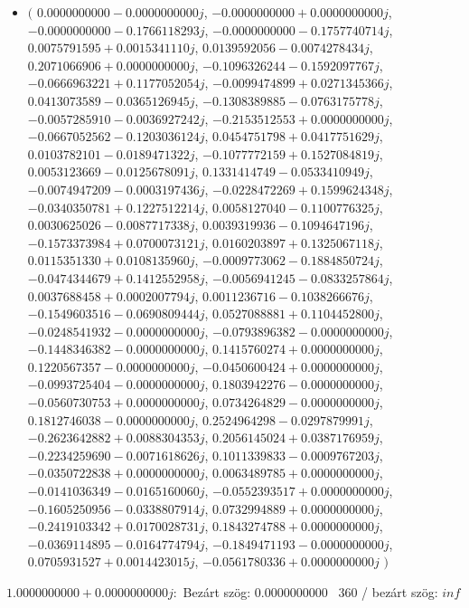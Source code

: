 \documentclass[14pt,a4paper]{article}
\begin{document}
\begin{itemize}
\item
$\big($
$0.0000000000-0.0000000000j$, $-0.0000000000+0.0000000000j$, $-0.0000000000-0.1766118293j$, $-0.0000000000-0.1757740714j$, $0.0075791595+0.0015341110j$, $0.0139592056-0.0074278434j$, $0.2071066906+0.0000000000j$, $-0.1096326244-0.1592097767j$, $-0.0666963221+0.1177052054j$, $-0.0099474899+0.0271345366j$, $0.0413073589-0.0365126945j$, $-0.1308389885-0.0763175778j$, $-0.0057285910-0.0036927242j$, $-0.2153512553+0.0000000000j$, $-0.0667052562-0.1203036124j$, $0.0454751798+0.0417751629j$, $0.0103782101-0.0189471322j$, $-0.1077772159+0.1527084819j$, $0.0053123669-0.0125678091j$, $0.1331414749-0.0533410949j$, $-0.0074947209-0.0003197436j$, $-0.0228472269+0.1599624348j$, $-0.0340350781+0.1227512214j$, $0.0058127040-0.1100776325j$, $0.0030625026-0.0087717338j$, $0.0039319936-0.1094647196j$, $-0.1573373984+0.0700073121j$, $0.0160203897+0.1325067118j$, $0.0115351330+0.0108135960j$, $-0.0009773062-0.1884850724j$, $-0.0474344679+0.1412552958j$, $-0.0056941245-0.0833257864j$, $0.0037688458+0.0002007794j$, $0.0011236716-0.1038266676j$, $-0.1549603516-0.0690809444j$, $0.0527088881+0.1104452800j$, $-0.0248541932-0.0000000000j$, $-0.0793896382-0.0000000000j$, $-0.1448346382-0.0000000000j$, $0.1415760274+0.0000000000j$, $0.1220567357-0.0000000000j$, $-0.0450600424+0.0000000000j$, $-0.0993725404-0.0000000000j$, $0.1803942276-0.0000000000j$, $-0.0560730753+0.0000000000j$, $0.0734264829-0.0000000000j$, $0.1812746038-0.0000000000j$, $0.2524964298-0.0297879991j$, $-0.2623642882+0.0088304353j$, $0.2056145024+0.0387176959j$, $-0.2234259690-0.0071618626j$, $0.1011339833-0.0009767203j$, $-0.0350722838+0.0000000000j$, $0.0063489785+0.0000000000j$, $-0.0141036349-0.0165160060j$, $-0.0552393517+0.0000000000j$, $-0.1605250956-0.0338807914j$, $0.0732994889+0.0000000000j$, $-0.2419103342+0.0170028731j$, $0.1843274788+0.0000000000j$, $-0.0369114895-0.0164774794j$, $-0.1849471193-0.0000000000j$, $0.0705931527+0.0014423015j$, $-0.0561780336+0.0000000000j$
$\big)$
\end{itemize}
$1.0000000000+0.0000000000j$:\
Bezárt szög: $0.0000000000$ \
360 / bezárt szög: $inf$\
\end{document}
